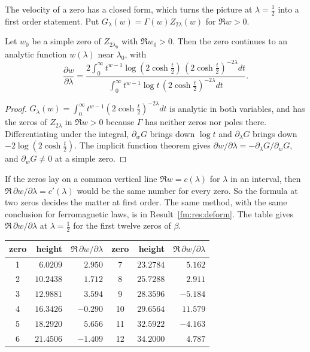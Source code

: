 The velocity of a zero has a closed form, which turns the picture at $\lambda=\frac12$ into a first order statement. Put $G_\lambda(w)=\Gamma(w)Z_{2\lambda}(w)$ for $\Re w>0$.
\begin{proposition}\label{ml:prop:vel}
Let $w_0$ be a simple zero of $Z_{2\lambda_0}$ with $\Re w_0>0$. Then the zero continues to an analytic function $w(\lambda)$ near $\lambda_0$, with
\[
\frac{\partial w}{\partial\lambda}
=\frac{2\int_0^\infty t^{w-1}\log(2\cosh\tfrac t2)\,(2\cosh\tfrac t2)^{-2\lambda}dt}
{\int_0^\infty t^{w-1}\log t\,(2\cosh\tfrac t2)^{-2\lambda}dt}.
\]
\end{proposition}
\begin{proof}
$G_\lambda(w)=\int_0^\infty t^{w-1}(2\cosh\frac t2)^{-2\lambda}dt$ is analytic in both variables, and has the zeros of $Z_{2\lambda}$ in $\Re w>0$ because $\Gamma$ has neither zeros nor poles there. Differentiating under the integral, $\partial_wG$ brings down $\log t$ and $\partial_\lambda G$ brings down $-2\log(2\cosh\frac t2)$. The implicit function theorem gives $\partial w/\partial\lambda=-\partial_\lambda G/\partial_wG$, and $\partial_wG\ne0$ at a simple zero.
\end{proof}
If the zeros lay on a common vertical line $\Re w=c(\lambda)$ for $\lambda$ in an interval, then $\Re\,\partial w/\partial\lambda=c'(\lambda)$ would be the same number for every zero. So the formula at two zeros decides the matter at first order. The same method, with the same conclusion for ferromagnetic laws, is in Result~\ref{fm:res:deform}. The table gives $\Re\,\partial w/\partial\lambda$ at $\lambda=\frac12$ for the first twelve zeros of $\beta$.
\begin{center}
\small
\begin{tabular}{crrcrr}
\toprule
zero & height & $\Re\,\partial w/\partial\lambda$ & zero & height & $\Re\,\partial w/\partial\lambda$\\
\midrule
1 & $6.0209$ & $2.950$ & 7 & $23.2784$ & $5.162$\\
2 & $10.2438$ & $1.712$ & 8 & $25.7288$ & $2.911$\\
3 & $12.9881$ & $3.594$ & 9 & $28.3596$ & $-5.184$\\
4 & $16.3426$ & $-0.290$ & 10 & $29.6564$ & $11.579$\\
5 & $18.2920$ & $5.656$ & 11 & $32.5922$ & $-4.163$\\
6 & $21.4506$ & $-1.409$ & 12 & $34.2000$ & $4.787$\\
\bottomrule
\end{tabular}
\end{center}
